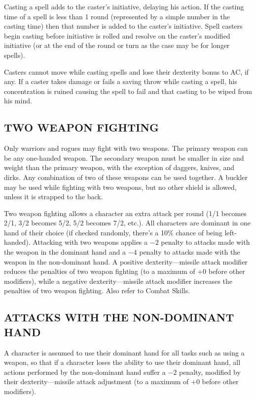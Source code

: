\begin{multicols}{2}
Casting a spell adds to the caster's initiative, delaying his action.  If the casting time of a spell is less than 1 round (represented by a simple number in the casting time) then that number is added to the caster's initiative.  Spell casters begin casting before initiative is rolled and resolve on the caster's modified initiative (or at the end of the round or turn as the case may be for longer spells).  

Casters cannot move while casting spells and lose their dexterity bonus to AC, if any.  If a caster takes damage or fails a saving throw while casting a spell, his concentration is ruined causing the spell to fail and that casting to be wiped from his mind. 

\subsection{TWO WEAPON FIGHTING}

Only warriors and rogues may fight with two weapons.  The primary weapon can be any one-handed weapon.  The secondary weapon must be smaller in size and weight than the primary weapon, with the exception of daggers, knives, and dirks.  Any combination of two of these weapons can be used together.  A buckler may be used while fighting with two weapons, but no other shield is allowed, unless it is strapped to the back.  

Two weapon fighting allows a character an extra attack per round (1/1 becomes 2/1, 3/2 becomes 5/2, 5/2 becomes 7/2, etc.).  All characters are dominant in one hand of their choice (if checked randomly, there's a 10\% chance of being left-handed).  Attacking with two weapons applies a $-2$ penalty to attacks made with the weapon in the dominant hand and a $-4$ penalty to attacks made with the weapon in the non-dominant hand.  A positive dexterity---missile attack modifier reduces the penalties of two weapon fighting (to a maximum of +0 before other modifiers), while a negative dexterity---missile attack modifier increases the penalties of two weapon fighting.  Also refer to Combat Skills.

\subsection{ATTACKS WITH THE NON-DOMINANT HAND}

A character is assumed to use their dominant hand for all tasks such as using a weapon, so that if a character loses the ability to use their dominant hand, all actions performed by the non-dominant hand suffer a $-2$ penalty, modified by their dexterity---missile attack adjustment (to a maximum of +0 before other modifiers). 
 

\end{multicols}
